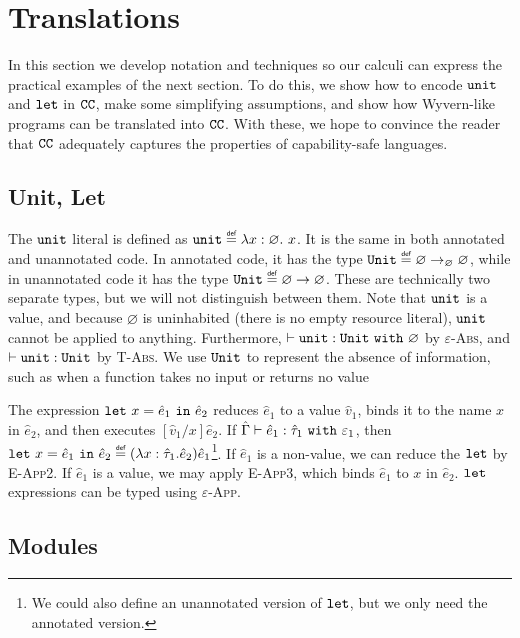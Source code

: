 \section{Translations}

In this section we develop notation and techniques so our calculi can express the practical examples of the next section. To do this, we show how to encode $\mathtt{unit}$ and $\mathtt{let}$ in $\mathtt{CC}$, make some simplifying assumptions, and show how Wyvern-like programs can be translated into $\mathtt{CC}$. With these, we hope to convince the reader that $\mathtt{CC}$ adequately captures the properties of capability-safe languages.

\subsection{Unit, Let}

The $\mathtt{unit}$ literal is defined as $\unit \defn \lambda x: \varnothing.~x$. It is the same in both annotated and unannotated code. In annotated code, it has the type $\Unit \defn \varnothing \rightarrow_{\varnothing} \varnothing$, while in unannotated code it has the type $\Unit \defn \varnothing \rightarrow \varnothing$. These are technically two separate types, but we will not distinguish between them. Note that $\mathtt{unit}$ is a value, and because $\varnothing$ is uninhabited (there is no empty resource literal), $\mathtt{unit}$ cannot be applied to anything. Furthermore, $\vdash \mathtt{unit}: \mathtt{Unit}~\mathtt{with}~ \varnothing$ by \textsc{$\varepsilon$-Abs}, and $\vdash \mathtt{unit}: \mathtt{Unit}$ by \textsc{T-Abs}. We use $\mathtt{Unit}$ to represent the absence of information, such as when a function takes no input or returns no value

The expression $\mathtt{let}~ x = \hat e_1~\mathtt{in}~ \hat e_2$ reduces $\hat e_1$ to a value $\hat v_1$, binds it to the name $x$ in $\hat e_2$, and then executes $[\hat v_1/x]\hat e_2$. If $\hat \Gamma \vdash \hat e_1: \hat \tau_1~\mathtt{with}~ \varepsilon_1$, then $\letxpr{x}{\hat e_1}{\hat e_2} \defn (\lambda x: \hat \tau_1 . \hat e_2) \hat e_1$\footnote{We could also define an unannotated version of $\mathtt{let}$, but we only need the annotated version.}. If $\hat e_1$ is a non-value, we can reduce the $\mathtt{let}$ by \textsc{E-App2}. If $\hat e_1$ is a value, we may apply \textsc{E-App3}, which binds $\hat e_1$ to $x$ in $\hat e_2$. $\mathtt{let}$ expressions can be typed using \textsc{$\varepsilon$-App}.

\subsection{Modules}

